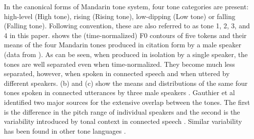 \documentclass{article}
\begin{document}
In the canonical forms of Mandarin tone system, four tone categories are present: high-level (High tone), rising (Rising tone), low-dipping (Low tone) or falling (Falling tone). Following convention, these are also referred to as tone 1, 2, 3, and 4 in this paper.  shows the (time-normalized) F0 contours of five tokens and their means of the four Mandarin tones produced in citation form by a male speaker (data from \cite{xu:97}). As can be seen, when produced in isolation by a single speaker, the tones are well separated even when time-normalized. They become much less separated, however, when spoken in connected speech and when uttered by different speakers. (b) and (c) show the means and distributions of the same four tones spoken in connected utterances by three male speakers \cite{xu:97}. Gauthier et al\cite{gauthier:07} identified two major sources for the extensive overlap between the tones. The first is the difference in the pitch range of individual speakers and the second is the variability introduced by tonal context in connected speech \cite{shen:90, xu:97}. Similar variability has been found in other tone languages \cite{han:74}. 



\end{document}
